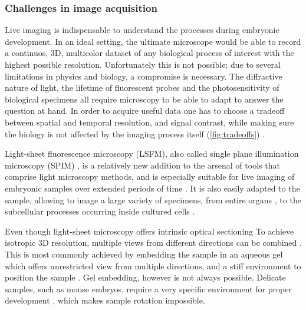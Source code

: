 \documentclass{booklet_style}
\begin{document}
\subsubsection{Challenges in image acquisition}
Live imaging is indispensable to understand the processes during embryonic development. In an ideal setting, the ultimate microscope would be able to record a continuos, 3D, multicolor dataset of any biological process of interest with the highest possible resolution. Unfortunately this is not possible; due to several limitations in physics and biology, a compromise is necessary. The diffractive nature of light, the lifetime of fluorescent probes and the photosensitivity of biological specimens all require microscopy to be able to adapt to answer the question at hand. In order to acquire useful data one has to choose a tradeoff between spatial and temporal resolution, and signal contrast, while making sure the biology is not affected by the imaging process itself (\autoref{fig:tradeoffs}) \cite{laissue_assessing_2017}.

Light-sheet fluorescence microscopy (LSFM), also called single plane illumination microscopy (SPIM) \cite{huisken_optical_2004}, is a relatively new addition to the arsenal of tools that comprise light microscopy methods, and is especially suitable for live imaging of embryonic samples over extended periods of time \cite{keller_quantitative_2008, huisken_selective_2009, weber_light_2011,tomer_shedding_2011}. It is also easily adapted to the sample, allowing to image a large variety of specimens, from entire organs \cite{dodt_ultramicroscopy:_2007}, to the subcellular processes occurring inside cultured cells \cite{chen_lattice_2014}.

Even though light-sheet microscopy offers intrinsic optical sectioning
To achieve isotropic 3D resolution, multiple views from different directions can be combined \cite{preibisch_efficient_2014}. This is most commonly achieved by embedding the sample in an aqueous gel which offers unrestricted view from multiple directions, and a stiff environment to position the sample \cite{krzic_multiview_2012}. Gel embedding, however is not always possible. Delicate samples, such as mouse embryos, require a very specific environment for proper development \cite{doherty_culture_2000}, which makes sample rotation impossible.
\end{document}
